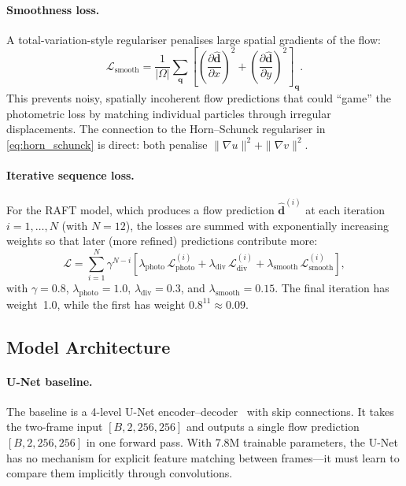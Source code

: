 \documentclass[11pt, a4paper]{article}
\newcommand{\pd}[2]{\frac{\partial #1}{\partial #2}}
\newcommand{\vect}[1]{\bm{#1}}
\begin{document}
\paragraph{Smoothness loss.}
A total-variation-style regulariser penalises large spatial gradients of the flow:
\begin{equation}
    \mathcal{L}_\text{smooth} = \frac{1}{|\Omega|} \sum_{\vect{q}} \left[ \left(\pd{\hat{\vect{d}}}{x}\right)^2 + \left(\pd{\hat{\vect{d}}}{y}\right)^2 \right]_{\vect{q}}.
    \label{eq:smooth_loss}
\end{equation}
This prevents noisy, spatially incoherent flow predictions that could ``game'' the photometric loss by matching individual particles through irregular displacements.
The connection to the Horn--Schunck regulariser in \cref{eq:horn_schunck} is direct: both penalise $\|\nabla u\|^2 + \|\nabla v\|^2$.

\paragraph{Iterative sequence loss.}
For the RAFT model, which produces a flow prediction $\hat{\vect{d}}^{(i)}$ at each iteration $i = 1, \ldots, N$ (with $N=12$), the losses are summed with exponentially increasing weights so that later (more refined) predictions contribute more:
\begin{equation}
    \mathcal{L} = \sum_{i=1}^{N} \gamma^{N-i} \left[ \lambda_\text{photo}\, \mathcal{L}_\text{photo}^{(i)} + \lambda_\text{div}\, \mathcal{L}_\text{div}^{(i)} + \lambda_\text{smooth}\, \mathcal{L}_\text{smooth}^{(i)} \right],
    \label{eq:total_loss}
\end{equation}
with $\gamma = 0.8$, $\lambda_\text{photo} = 1.0$, $\lambda_\text{div} = 0.3$, and $\lambda_\text{smooth} = 0.15$.
The final iteration has weight~1.0, while the first has weight $0.8^{11} \approx 0.09$.

\subsection{Model Architecture}
\label{sec:architecture}

\paragraph{U-Net baseline.}
The baseline is a 4-level U-Net encoder--decoder~\cite{ronneberger2015unet} with skip connections.
It takes the two-frame input $[B, 2, 256, 256]$ and outputs a single flow prediction $[B, 2, 256, 256]$ in one forward pass.
With 7.8M trainable parameters, the U-Net has no mechanism for explicit feature matching between frames---it must learn to compare them implicitly through convolutions.
\end{document}
